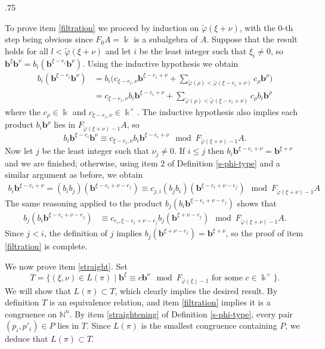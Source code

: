 \documentclass[11pt,fleqn]{article}
\makeatletter
\renewenvironment{proof}[1][\textit{Proof}]{\par
  \pushQED{\qed}%
  \normalfont \topsep.75\paraskip\relax
  \trivlist
  \item[\hskip\labelsep
        \itshape
    #1\@addpunct{.}]\ignorespaces
}{%
  \popQED\endtrivlist\@endpefalse
}
\newcommand\NN{\mathbb N}
\renewcommand\phi{\varphi}
\newcommand\tphi{\tilde \phi}
\renewcommand\b{\mathbf b}
\renewcommand\k{\Bbbk}
\makeatother
\begin{document}
\begin{proof}
To prove item \ref{filtration} we proceed by induction on $\tphi(\xi + \nu)$, 
with the $0$-th step being obvious since $F_0A = \k$ is a subalgebra of $A$. 
Suppose that the result holds for all $l < \tphi(\xi + \nu)$ and let $i$ be 
the least integer such that $\xi_i \neq 0$, so $\b^\xi \b^\nu = b_i (\b^{\xi - 
e_i} \b ^\nu)$. Using the inductive hypothesis we obtain
\begin{align*}
b_i (\b^{\xi - e_i} \b^\nu) 
&= b_i \bigg( c_{\xi- e_i, \nu} \b^{\xi - e_i + \nu} 
  + \sum_{\tphi(\rho) < \tphi(\xi - e_i + \nu)} c_\rho \b^\rho \bigg)\\
&= c_{\xi- e_i, \nu} b_i \b^{\xi - e_i + \nu} 
  + \sum_{\tphi(\rho) < \tphi(\xi - e_i + \nu)} c_\rho b_i \b^\rho
\end{align*}
where the $c_\rho \in \k$ and $c_{\xi - e_i,\nu} \in \k^\times$. The 
inductive  hypothesis also implies each product $b_i \b^\rho$ lies in 
$F_{\tphi(\xi + \nu) -1} A$, so
\[
  b_i \b^{\xi - e_i} \b^\nu 
    \equiv c_{\xi- e_i, \nu} b_i \b^{\xi - e_i + \nu} 
    \mod F_{\tphi(\xi + \nu)-1}A.
\]
Now let $j$ be the least integer such that $\nu_j \neq 0$. If $i \leq j$ then 
$b_i \b^{\xi - e_i + \nu} = \b^{\xi + \nu}$ and we are finished; otherwise, 
using item 2 of Definition \ref{s-phi-type} and a similar argument as before, 
we obtain
\begin{align*}
  b_i \b^{\xi - e_i + \nu} 
    = (b_i b_j)(\b^{\xi - e_i + \nu - e_j}) 
    \equiv c_{j,i} (b_j b_i)(\b^{\xi - e_i + \nu - e_j}) 
    \mod F_{\tphi(\xi + \nu) - 1}A
\end{align*}
The same reasoning applied to the product $b_j(b_i\b^{\xi - e_i + \nu - e_j})$ 
shows that
\begin{align*}
  b_j (b_i \b^{\xi - e_i + \nu - e_j}) 
    &\equiv c_{e_i, \xi - e_i + \nu - e_j} b_j(\b^{\xi  + \nu - e_j}) \mod
  F_{\tphi(\xi + \nu) - 1}A.
\end{align*}
Since $j < i$, the definition of $j$ implies $b_j(\b^{\xi  + \nu - e_j}) = 
\b^{\xi + \nu}$, so the proof of item \ref{filtration} is complete.

We now prove item \ref{straight}. Set
\[
  T = \{(\xi, \nu) \in L(\pi) \mid \b^\xi \equiv c \b^{\nu} \mod
    F_{\tphi(\xi) -1}
    \mbox{ for some } c \in \k^\times\}.
\]
We will show that $L(\pi) \subset T$, which clearly implies the desired result.
By definition $T$ is an equivalence relation, and item \ref{filtration} 
implies it is a congruence on $\NN^n$. By item \ref{straightening} of 
Definition \ref{s-phi-type}, every pair $(p_i, p'_i) \in P$ lies in $T$. Since 
$L(\pi)$ is the smallest congruence containing $P$, we deduce that $L(\pi) 
\subset T$.
\end{proof}
\end{document}
